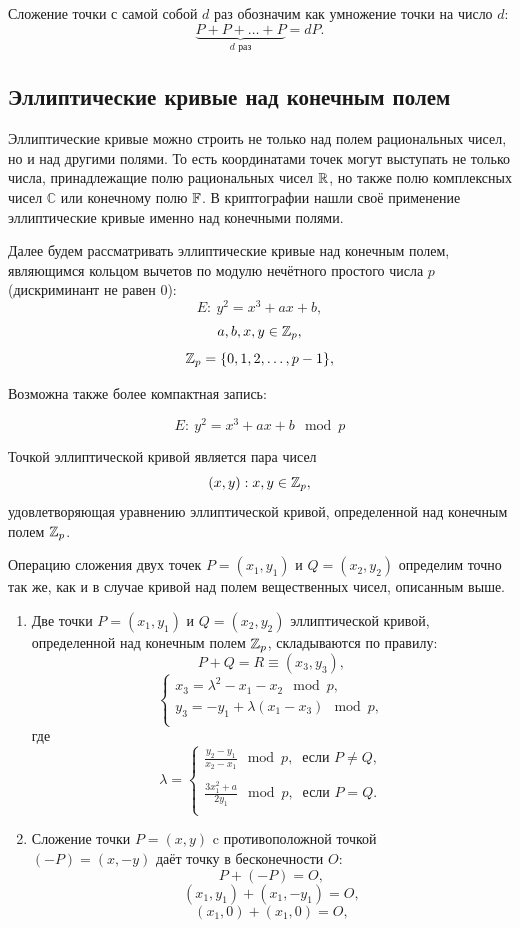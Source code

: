 Сложение точки с самой собой $d$ раз обозначим как умножение точки на число $d$:
    \[ \underbrace{P + P + \ldots + P}_{d \text{ раз}} = d P. \]


\subsection{Эллиптические кривые над конечным полем}

Эллиптические кривые можно строить не только над полем рациональных чисел, но и над другими полями. То есть координатами точек могут выступать не только числа, принадлежащие полю рациональных чисел $\mathbb{R}$, но также полю комплексных чисел $\mathbb{C}$ или конечному полю $\mathbb{F}$. В криптографии нашли своё применение эллиптические кривые именно над конечными полями.

Далее будем рассматривать эллиптические кривые над конечным полем, являющимся кольцом вычетов по модулю нечётного простого числа $p$ (дискриминант не равен 0):
    \[ E: ~ y^2 = x^3 + a x + b, \]
    \[ a, b, x, y \in \mathbb{Z}_p, \]
    \[ \mathbb{Z}_p = \{0, 1, 2,  \ldots,  p-1\},\]

Возможна также более компактная запись:

    \[ E: ~ y^2 = x^3 + a x + b \mod p\]

Точкой эллиптической кривой является пара чисел
    \[ (x,y): x, y \in \mathbb{Z}_p, \]
удовлетворяющая уравнению эллиптической кривой, определенной над конечным полем $\mathbb{Z}_p$.

Операцию сложения двух точек $P = (x_1, y_1)$ и $Q = (x_2, y_2)$ определим точно так же, как и в случае кривой над полем вещественных чисел, описанным выше.

\begin{enumerate}
    \item Две точки $P = (x_1, y_1)$ и $Q = (x_2, y_2)$ эллиптической кривой, определенной над конечным полем $\mathbb{Z}_p$, складываются по правилу:
        \[
            P + Q = R \equiv (x_3, y_3),
        \] \[
            \left\{ \begin{array}{l}
                x_3 = \lambda^2 - x_1 - x_2 \mod p,\\
                y_3 = - y_1 + \lambda (x_1 - x_3) \mod p,\\
            \end{array} \right.
        \]
        где
        \[
            \lambda = \left\{ \begin{array}{l}
                \frac{y_2 - y_1}{x_2 - x_1} \mod p, ~ \text{ если } P \ne Q, \\
                \\
                \frac{3 x_1^2 + a}{2 y_1} \mod p, ~ \text{ если } P = Q. \\
            \end{array} \right.
        \]
    \item Сложение точки $P=(x,y)$ c противоположной точкой \\
        $(-P) = (x,-y)$ даёт точку в бесконечности $O$:
        \[ P + (-P) = O, \]
        \[ (x_1, y_1) + (x_1, -y_1) = O, \]
        \[ (x_1, 0) + (x_1, 0) = O, \]
\end{enumerate}

